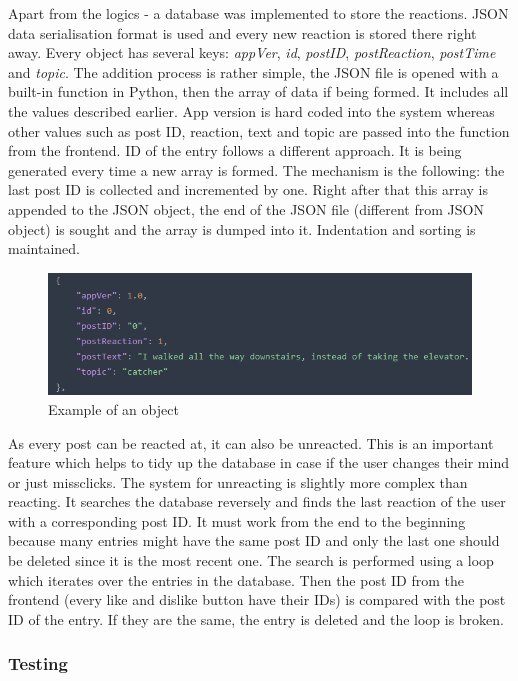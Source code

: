 \documentclass[12pt]{report}
\begin{document}
Apart from the logics - a database was implemented to store the reactions. JSON data serialisation format is used 
and every new reaction is stored there right away. Every object has several keys: \textit{appVer}, \textit{id},
\textit{postID}, \textit{postReaction}, \textit{postTime} and \textit{topic}. The addition process is rather simple,
the JSON file is opened with a built-in function in Python, then the array of data if being formed. It includes all
the values described earlier. App version is hard coded into the system whereas other values such as post ID, reaction,
text and topic are passed into the function from the frontend. ID of the entry follows a different approach. It is 
being generated every time a new array is formed. The mechanism is the following: the last post ID is collected and
incremented by one. Right after that this array is appended to the JSON object, the end of the JSON file (different from JSON object) 
is sought and the array is dumped into it. Indentation and sorting is maintained.

\begin{figure}[ht]
  \centering
  \includegraphics[width=.7\linewidth]{img/json_entry.png}
  \caption{Example of an object}
  \label{fig:json_entry}
\end{figure}

As every post can be reacted at, it can also be unreacted. This is an important feature which helps to tidy up the
database in case if the user changes their mind or just missclicks. The system for unreacting is slightly more
complex than reacting. It searches the database reversely and finds the last reaction of the user with a corresponding
post ID. It must work from the end to the beginning because many entries might have the same post ID and only the last
one should be deleted since it is the most recent one. The search is performed using a loop which iterates over the
entries in the database. Then the post ID from the frontend (every like and dislike button have their IDs) is compared
with the post ID of the entry. If they are the same, the entry is deleted and the loop is broken.

\subsubsection*{Testing}
\end{document}
